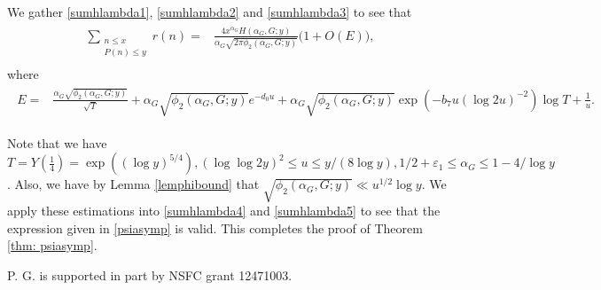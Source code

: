 \documentclass[twoside,leqno,10pt, A4]{amsart}
\begin{document}
  We gather \eqref{sumhlambda1}, \eqref{sumhlambda2} and \eqref{sumhlambda3} to see that
\begin{align}
\label{sumhlambda4}
\begin{split}
\sum_{\substack{n \leq x \\ P(n) \leq y}} r(n) =&  \frac {4x^{\alpha_G}H(\alpha_G,G;y)}{\alpha_G\sqrt{2\pi \phi_2(\alpha_G, G; y)}}\Big (1+ O(E) \Big ),
\end{split} 
\end{align}   
 where
\begin{align}
\label{sumhlambda5}
\begin{split}
E
=&  \frac {\alpha_G\sqrt{\phi_2(\alpha_G, G; y)}}{\sqrt{T}}+ \alpha_G\sqrt{\phi_2(\alpha_G, G; y)}e^{-d_0u}+\alpha_G\sqrt{\phi_2(\alpha_G, G; y)}\exp(-b_7u(\log 2u)^{-2})\log T+\frac 1u .
\end{split} 
\end{align}   

  Note that we have $T=Y(\frac 14)=\exp((\log y)^{5/4}),  (\log \log 2y)^2 \leq u \leq y/(8\log y), 1/2+\varepsilon_1 \leq \alpha_G \leq 1-4/\log y$. Also, we have by Lemma \ref{lemphibound} that 
$\sqrt{\phi_2(\alpha_G,G;y)} \ll u^{1/2}\log y$. We apply these estimations into \eqref{sumhlambda4} and \eqref{sumhlambda5} to see that the expression given in \eqref{psiasymp} is valid. This completes the proof of Theorem \ref{thm: psiasymp}. 





 























\vspace*{.5cm}

 P. G. is supported in part by NSFC grant 12471003.



\end{document}
